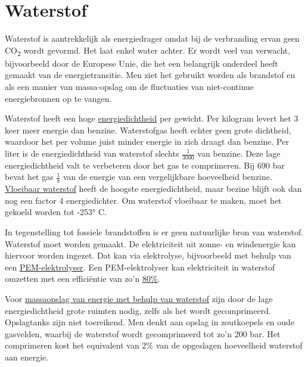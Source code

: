 \documentclass[
  11pt,
  a4paper,
]{book}
\begin{document}
\hypertarget{waterstof}{%
\section{Waterstof}\label{waterstof}}

Waterstof is aantrekkelijk als energiedrager omdat bij de verbranding ervan geen CO\textsubscript{2} wordt gevormd. Het laat enkel water achter. Er wordt veel van verwacht, bijvoorbeeld door de Europese Unie, die het een belangrijk onderdeel heeft gemaakt van de energietransitie. Men ziet het gebruikt worden als brandstof en als een manier van massa-opslag om de fluctuaties van niet-continue energiebronnen op te vangen.

Waterstof heeft een hoge \href{https://en.wikipedia.org/wiki/Energy_density}{energiedichtheid} per gewicht. Per kilogram levert het 3 keer meer energie dan benzine. Waterstofgas heeft echter geen grote dichtheid, waardoor het per volume juist minder energie in zich draagt dan benzine. Per liter is de energiedichtheid van waterstof slechts \(\frac{1}{3000}\) van benzine. Deze lage energiedichtheid valt te verbeteren door het gas te comprimeren. Bij 690 bar bevat het gas \(\frac{1}{8}\) van de energie van een vergelijkbare hoeveelheid benzine. \href{https://en.wikipedia.org/wiki/Liquid_hydrogen}{Vloeibaar waterstof} heeft de hoogste energiedichtheid, maar bezine blijft ook dan nog een factor 4 energiedichter. Om waterstof vloeibaar te maken, moet het gekoeld worden tot -253° C.

In tegenstelling tot fossiele brandstoffen is er geen natuurlijke bron van waterstof. Waterstof moet worden gemaakt. De elektriciteit uit zonne- en windenergie kan hiervoor worden ingezet. Dat kan via elektrolyse, bijvoorbeeld met behulp van een \href{https://en.wikipedia.org/wiki/Polymer_electrolyte_membrane_electrolysis}{PEM-elektrolyser}. Een PEM-elektrolyser kan elektriciteit in waterstof omzetten met een efficiëntie van zo'n \href{https://en.wikipedia.org/wiki/Polymer_electrolyte_membrane_electrolysis\#PEM_Efficiency}{80\%}.

Voor \href{https://en.wikipedia.org/wiki/Hydrogen_storage\#Underground_hydrogen_storage}{massaopslag van energie met behulp van waterstof} zijn door de lage energiedichtheid grote ruimten nodig, zelfs als het wordt gecomprimeerd. Opslagtanks zijn niet toereikend. Men denkt aan opslag in zoutkoepels en oude gasvelden, waarbij de waterstof wordt gecomprimeerd tot zo'n 200 bar. Het comprimeren kost het equivalent van 2\% van de opgeslagen hoeveelheid waterstof aan energie.
\end{document}
